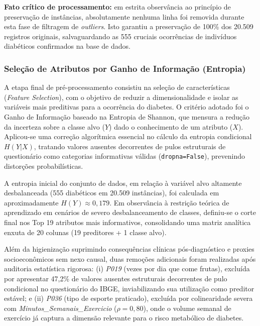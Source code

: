 \documentclass[12pt, a4paper]{article}
\begin{document}
    \textbf{Fato crítico de processamento:} em estrita observância ao princípio de preservação de instâncias, absolutamente nenhuma linha foi removida durante esta fase de filtragem de \textit{outliers}. Isto garantiu a preservação de 100\% dos 20.509 registros originais, salvaguardando as 555 cruciais ocorrências de indivíduos diabéticos confirmados na base de dados.

    \subsubsection{Seleção de Atributos por Ganho de Informação (Entropia)}

    A etapa final de pré-processamento consistiu na seleção de características (\textit{Feature Selection}), com o objetivo de reduzir a dimensionalidade e isolar as variáveis mais preditivas para a ocorrência do diabetes. O critério adotado foi o Ganho de Informação baseado na Entropia de Shannon, que mensura a redução da incerteza sobre a classe alvo ($Y$) dado o conhecimento de um atributo ($X$). Aplicou-se uma correção algorítmica essencial no cálculo da entropia condicional $H(Y|X)$, tratando valores ausentes decorrentes de pulos estruturais de questionário como categorias informativas válidas (\texttt{dropna=False}), prevenindo distorções probabilísticas.
    
    A entropia inicial do conjunto de dados, em relação à variável alvo altamente desbalanceada (555 diabéticos em 20.509 instâncias), foi calculada em aproximadamente $H(Y) \approx 0,179$. Em observância à restrição teórica de aprendizado em cenários de severo desbalanceamento de classes, definiu-se o corte final nos Top 19 atributos mais informativos, consolidando uma matriz analítica enxuta de 20 colunas (19 preditores + 1 classe alvo).

    Além da higienização suprimindo consequências clínicas pós-diagnóstico e proxies socioeconômicos sem nexo causal, duas remoções adicionais foram realizadas após auditoria estatística rigorosa: (i) \textit{P019} (vezes por dia que come frutas), excluída por apresentar 47,2\% de valores ausentes estruturais decorrentes de pulo condicional no questionário do IBGE, inviabilizando sua utilização como preditor estável; e (ii) \textit{P036} (tipo de esporte praticado), excluída por colinearidade severa com \textit{Minutos\_Semanais\_Exercicio} ($\rho = 0,80$), onde o volume semanal de exercício já captura a dimensão relevante para o risco metabólico de diabetes.
\end{document}
